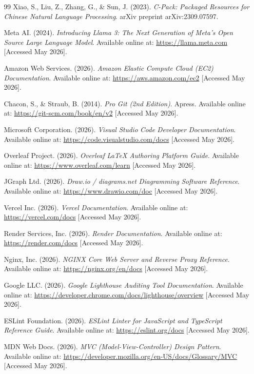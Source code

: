 \documentclass[12pt,a4paper]{report}
\begin{document}
\begin{thebibliography}{99}
Xiao, S., Liu, Z., Zhang, G., \& Sun, J. (2023). \textit{C-Pack: Packaged Resources for Chinese Natural Language Processing}. arXiv preprint arXiv:2309.07597.

Meta AI. (2024). \textit{Introducing Llama 3: The Next Generation of Meta's Open Source Large Language Model}. Available online at: \url{https://llama.meta.com} [Accessed May 2026].

Amazon Web Services. (2026). \textit{Amazon Elastic Compute Cloud (EC2) Documentation}. Available online at: \url{https://aws.amazon.com/ec2} [Accessed May 2026].

Chacon, S., \& Straub, B. (2014). \textit{Pro Git (2nd Edition)}. Apress. Available online at: \url{https://git-scm.com/book/en/v2} [Accessed May 2026].

Microsoft Corporation. (2026). \textit{Visual Studio Code Developer Documentation}. Available online at: \url{https://code.visualstudio.com/docs} [Accessed May 2026].

Overleaf Project. (2026). \textit{Overleaf LaTeX Authoring Platform Guide}. Available online at: \url{https://www.overleaf.com/learn} [Accessed May 2026].

JGraph Ltd. (2026). \textit{Draw.io / diagrams.net Diagramming Software Reference}. Available online at: \url{https://www.drawio.com/doc} [Accessed May 2026].

Vercel Inc. (2026). \textit{Vercel Documentation}. Available online at: \url{https://vercel.com/docs} [Accessed May 2026].

Render Services, Inc. (2026). \textit{Render Documentation}. Available online at: \url{https://render.com/docs} [Accessed May 2026].

Nginx, Inc. (2026). \textit{NGINX Core Web Server and Reverse Proxy Reference}. Available online at: \url{https://nginx.org/en/docs} [Accessed May 2026].

Google LLC. (2026). \textit{Google Lighthouse Auditing Tool Documentation}. Available online at: \url{https://developer.chrome.com/docs/lighthouse/overview} [Accessed May 2026].

ESLint Foundation. (2026). \textit{ESLint Linter for JavaScript and TypeScript Reference Guide}. Available online at: \url{https://eslint.org/docs} [Accessed May 2026].

MDN Web Docs. (2026). \textit{MVC (Model-View-Controller) Design Pattern}. Available online at: \url{https://developer.mozilla.org/en-US/docs/Glossary/MVC} [Accessed May 2026].

\end{thebibliography}
\end{document}
